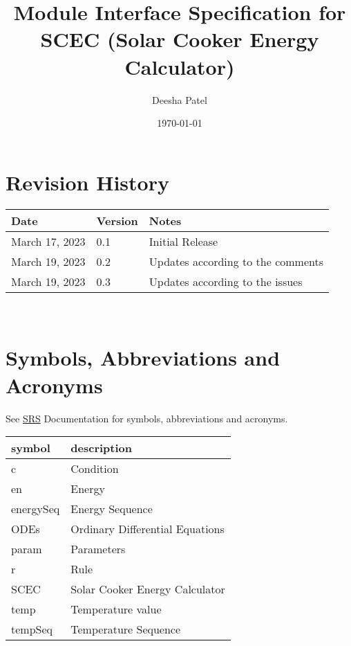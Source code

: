 \documentclass[12pt, titlepage]{article}
\begin{document}
\title{Module Interface Specification for SCEC (Solar Cooker Energy Calculator)}

\author{Deesha Patel}

\date{\today}

\maketitle


\section{Revision History}

\begin{tabularx}{\textwidth}{p{3cm}p{2cm}X}
\toprule {\bf Date} & {\bf Version} & {\bf Notes}\\
\midrule
March 17, 2023 & 0.1 & Initial Release\\
March 19, 2023 & 0.2 & Updates according to the comments \\ 
March 19, 2023 & 0.3 & Updates according to the issues \\ 
\bottomrule
\end{tabularx}

~\newpage

\section{Symbols, Abbreviations and Acronyms}

See \href{https://github.com/DeeshaPatel/CAS-741-Solar-Cooker/blob/c7cc1be3611cae9110b84940b64ef40c7d29aa02/docs/SRS/SRS.pdf}{SRS} Documentation for symbols, abbreviations and acronyms. \\ 

\renewcommand{\arraystretch}{1.2}
\begin{tabular}{l l} 
  \toprule		
  \textbf{symbol} & \textbf{description}\\
  \midrule 
  c & Condition\\
  en & Energy \\
  energySeq & Energy Sequence\\
  ODEs & Ordinary Differential Equations \\ 
  param & Parameters\\
  r & Rule  \\
  SCEC & Solar Cooker Energy Calculator \\
  temp & Temperature value \\
  tempSeq & Temperature Sequence \\
  \bottomrule
\end{tabular}\\
\end{document}
